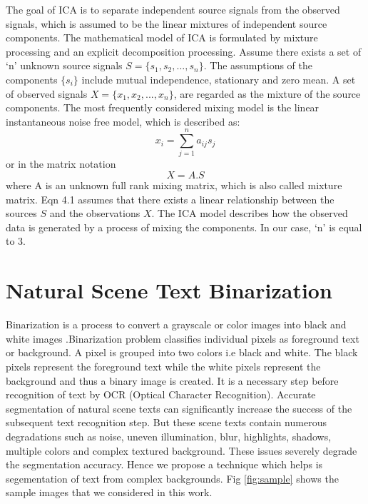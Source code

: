 The goal of ICA is to separate independent 
source signals from the observed signals, which is assumed 
to be the linear mixtures of independent source components. 
The mathematical model of ICA is formulated by 
mixture processing and an explicit decomposition processing.  
Assume there exists a set of `n' unknown source signals 
$S=\{s_1, s_2,..., s_n \}$. The assumptions of the components 
$\{s_i\}$  include mutual independence, stationary and zero mean. 
A set of observed signals $X=\{x_1,x_2,...,x_n\}$, are regarded as the mixture of the source 
components. The most frequently considered 
mixing model is the linear instantaneous noise free model,
which is described as: 
\begin{equation}
x_i=\sum_{j=1}^{n}a_{ij}s_j 
\end{equation}or in the matrix notation
\begin{equation}
X=A.S  
\end{equation}where A is an unknown full rank mixing matrix, which is 
also called mixture matrix. Eqn 4.1 assumes that there exists a 
linear relationship between the sources $S$ and the observations 
$X$. The ICA model describes how the observed data is 
generated by a process of mixing the components. In our case, `n' is equal to 3. 


\section{Natural Scene Text Binarization}
Binarization is a process to convert a grayscale or color 
images into black and white images .Binarization 
problem classifies individual pixels as foreground text or 
background. A pixel is grouped into two colors i.e black and white. The black pixels represent the 
foreground text while the white pixels represent the background and thus a binary image is created.
It is a necessary step before recognition of text by OCR (Optical Character Recognition). 
Accurate segmentation of natural scene texts can significantly increase the success of
the subsequent text recognition step. 
But these scene texts contain numerous degradations 
such as noise, uneven
illumination, blur, highlights, shadows,  multiple colors and complex textured background.
These issues severely degrade the segmentation accuracy. Hence we propose a technique which helps is 
segementation of text from complex backgrounds.
Fig \ref{fig:sample} shows the sample images that we considered in this work.


